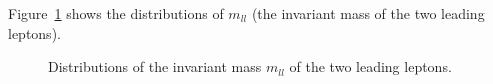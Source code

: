 \documentclass[12pt]{article}
\begin{document}
        
        Figure~\ref{fig:mll_distribution} shows the distributions of $m_{ll}$ (the invariant mass of the two leading leptons).
        \begin{figure}[htpb]
            \centering
            \caption{Distributions of the invariant mass $m_{ll}$ of the two leading leptons.}
            \label{fig:mll_distribution}
        \end{figure}
\end{document}
